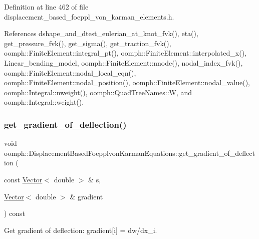 Definition at line 462 of file displacement\+\_\+based\+\_\+foeppl\+\_\+von\+\_\+karman\+\_\+elements.\+h.



References dshape\+\_\+and\+\_\+dtest\+\_\+eulerian\+\_\+at\+\_\+knot\+\_\+fvk(), eta(), get\+\_\+pressure\+\_\+fvk(), get\+\_\+sigma(), get\+\_\+traction\+\_\+fvk(), oomph\+::\+Finite\+Element\+::integral\+\_\+pt(), oomph\+::\+Finite\+Element\+::interpolated\+\_\+x(), Linear\+\_\+bending\+\_\+model, oomph\+::\+Finite\+Element\+::nnode(), nodal\+\_\+index\+\_\+fvk(), oomph\+::\+Finite\+Element\+::nodal\+\_\+local\+\_\+eqn(), oomph\+::\+Finite\+Element\+::nodal\+\_\+position(), oomph\+::\+Finite\+Element\+::nodal\+\_\+value(), oomph\+::\+Integral\+::nweight(), oomph\+::\+Quad\+Tree\+Names\+::W, and oomph\+::\+Integral\+::weight().

\mbox{\label{classoomph_1_1DisplacementBasedFoepplvonKarmanEquations_a96188696e059a5a74172be73756f8f27}} 
\subsubsection{\texorpdfstring{get\+\_\+gradient\+\_\+of\+\_\+deflection()}{get\_gradient\_of\_deflection()}}
{\footnotesize\ttfamily void oomph\+::\+Displacement\+Based\+Foepplvon\+Karman\+Equations\+::get\+\_\+gradient\+\_\+of\+\_\+deflection (\begin{DoxyParamCaption}\item[{const \hyperlink{classoomph_1_1Vector}{Vector}$<$ double $>$ \&}]{s,  }\item[{\hyperlink{classoomph_1_1Vector}{Vector}$<$ double $>$ \&}]{gradient }\end{DoxyParamCaption}) const\hspace{0.3cm}{\ttfamily [inline]}}



Get gradient of deflection\+: gradient\mbox{[}i\mbox{]} = dw/dx\+\_\+i. 



